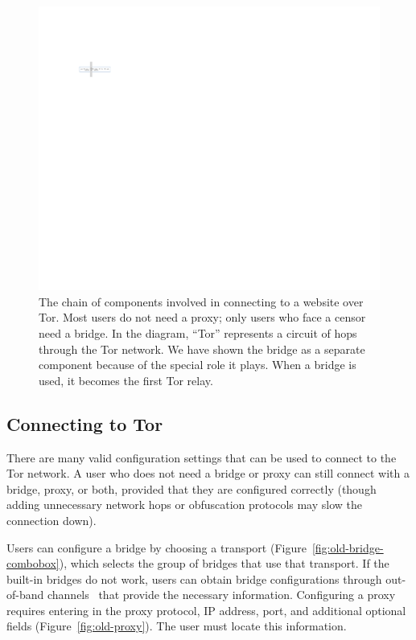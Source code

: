 \documentclass[USenglish,oneside,twocolumn]{article}
\begin{document}
\begin{figure}
\centering
\includegraphics{topology.pdf}
\caption{
The chain of components involved in connecting to a website over Tor.
Most users do not need a proxy;
only users who face a censor need a bridge.
In the diagram, ``Tor'' represents a circuit of hops through the Tor network.
We have shown the bridge as a separate component
because of the special role it plays.
When a bridge is used, it becomes the first Tor relay.
}
\label{fig:topology}
\end{figure}

\subsection{Connecting to Tor} 
There are many valid configuration settings that can be used to connect to the Tor network.
A user who does not need a bridge or proxy can still connect with a bridge, proxy, or both, provided that they are configured correctly (though adding unnecessary network hops or obfuscation protocols may slow the connection down).

Users can configure a bridge by choosing a transport (Figure~\ref{fig:old-bridge-combobox}), which selects the group of bridges that use that transport. If the built-in bridges do not work, users can obtain bridge configurations through out-of-band channels~\cite{bridgedb} that provide the necessary information. Configuring a proxy requires entering in the proxy protocol, IP address, port, and additional optional fields (Figure~\ref{fig:old-proxy}). The user must locate this information.
\end{document}
